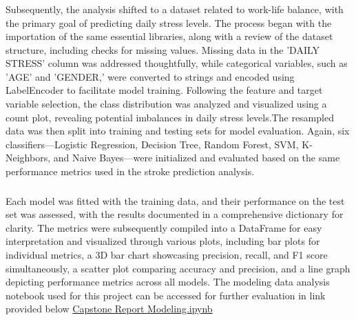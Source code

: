 \documentclass[runningheads]{llncs}
\begin{document}
\begin{enumerate}
\subsubsection{}

Subsequently, the analysis shifted to a dataset related to work-life balance, with the primary goal of predicting daily stress levels. The process began with the importation of the same essential libraries, along with a review of the dataset structure, including checks for missing values. Missing data in the 'DAILY STRESS' column was addressed thoughtfully, while categorical variables, such as 'AGE' and 'GENDER,' were converted to strings and encoded using LabelEncoder to facilitate model training. Following the feature and target variable selection, the class distribution was analyzed and visualized using a count plot, revealing potential imbalances in daily stress levels.The resampled data was then split into training and testing sets for model evaluation. Again, six classifiers—Logistic Regression, Decision Tree, Random Forest, SVM, K-Neighbors, and Naive Bayes—were initialized and evaluated based on the same performance metrics used in the stroke prediction analysis. 

\subsubsection{}

Each model was fitted with the training data, and their performance on the test set was assessed, with the results documented in a comprehensive dictionary for clarity. The metrics were subsequently compiled into a DataFrame for easy interpretation and visualized through various plots, including bar plots for individual metrics, a 3D bar chart showcasing precision, recall, and F1 score simultaneously, a scatter plot comparing accuracy and precision, and a line graph depicting performance metrics across all models. The modeling data analysis notebook used for this project can be accessed for further evaluation in link provided below \href{https://github.com/alvaroquintero28/Capstone-Project-Report/blob/main/modeling.ipynb}{Capstone Report Modeling.ipynb}


\end{enumerate}
\end{document}
